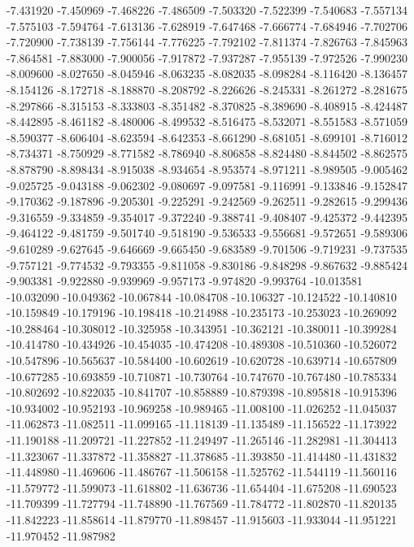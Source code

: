 -7.431920
-7.450969
-7.468226
-7.486509
-7.503320
-7.522399
-7.540683
-7.557134
-7.575103
-7.594764
-7.613136
-7.628919
-7.647468
-7.666774
-7.684946
-7.702706
-7.720900
-7.738139
-7.756144
-7.776225
-7.792102
-7.811374
-7.826763
-7.845963
-7.864581
-7.883000
-7.900056
-7.917872
-7.937287
-7.955139
-7.972526
-7.990230
-8.009600
-8.027650
-8.045946
-8.063235
-8.082035
-8.098284
-8.116420
-8.136457
-8.154126
-8.172718
-8.188870
-8.208792
-8.226626
-8.245331
-8.261272
-8.281675
-8.297866
-8.315153
-8.333803
-8.351482
-8.370825
-8.389690
-8.408915
-8.424487
-8.442895
-8.461182
-8.480006
-8.499532
-8.516475
-8.532071
-8.551583
-8.571059
-8.590377
-8.606404
-8.623594
-8.642353
-8.661290
-8.681051
-8.699101
-8.716012
-8.734371
-8.750929
-8.771582
-8.786940
-8.806858
-8.824480
-8.844502
-8.862575
-8.878790
-8.898434
-8.915038
-8.934654
-8.953574
-8.971211
-8.989505
-9.005462
-9.025725
-9.043188
-9.062302
-9.080697
-9.097581
-9.116991
-9.133846
-9.152847
-9.170362
-9.187896
-9.205301
-9.225291
-9.242569
-9.262511
-9.282615
-9.299436
-9.316559
-9.334859
-9.354017
-9.372240
-9.388741
-9.408407
-9.425372
-9.442395
-9.464122
-9.481759
-9.501740
-9.518190
-9.536533
-9.556681
-9.572651
-9.589306
-9.610289
-9.627645
-9.646669
-9.665450
-9.683589
-9.701506
-9.719231
-9.737535
-9.757121
-9.774532
-9.793355
-9.811058
-9.830186
-9.848298
-9.867632
-9.885424
-9.903381
-9.922880
-9.939969
-9.957173
-9.974820
-9.993764
-10.013581
-10.032090
-10.049362
-10.067844
-10.084708
-10.106327
-10.124522
-10.140810
-10.159849
-10.179196
-10.198418
-10.214988
-10.235173
-10.253023
-10.269092
-10.288464
-10.308012
-10.325958
-10.343951
-10.362121
-10.380011
-10.399284
-10.414780
-10.434926
-10.454035
-10.474208
-10.489308
-10.510360
-10.526072
-10.547896
-10.565637
-10.584400
-10.602619
-10.620728
-10.639714
-10.657809
-10.677285
-10.693859
-10.710871
-10.730764
-10.747670
-10.767480
-10.785334
-10.802692
-10.822035
-10.841707
-10.858889
-10.879398
-10.895818
-10.915396
-10.934002
-10.952193
-10.969258
-10.989465
-11.008100
-11.026252
-11.045037
-11.062873
-11.082511
-11.099165
-11.118139
-11.135489
-11.156522
-11.173922
-11.190188
-11.209721
-11.227852
-11.249497
-11.265146
-11.282981
-11.304413
-11.323067
-11.337872
-11.358827
-11.378685
-11.393850
-11.414480
-11.431832
-11.448980
-11.469606
-11.486767
-11.506158
-11.525762
-11.544119
-11.560116
-11.579772
-11.599073
-11.618802
-11.636736
-11.654404
-11.675208
-11.690523
-11.709399
-11.727794
-11.748890
-11.767569
-11.784772
-11.802870
-11.820135
-11.842223
-11.858614
-11.879770
-11.898457
-11.915603
-11.933044
-11.951221
-11.970452
-11.987982
